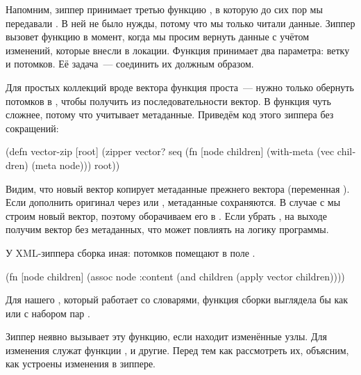 
Напомним, зиппер принимает третью функцию , в которую до сих пор мы
передавали . В ней не было нужды, потому что мы только читали
данные. Зиппер вызовет функцию в момент, когда мы просим вернуть данные с учётом
изменений, которые внесли в локации. Функция принимает два параметра: ветку и
потомков. Её задача~--- соединить их должным образом.

Для простых коллекций вроде вектора функция проста~--- нужно только обернуть
потомков в , чтобы получить из последовательности вектор. В 
функция чуть сложнее, потому что учитывает метаданные. Приведём код этого
зиппера без сокращений:


\begin{english}
  \begin{clojure/lines}
(defn vector-zip
  [root]
  (zipper vector?
          seq
          (fn [node children]
            (with-meta (vec children) (meta node)))
          root))
  \end{clojure/lines}
\end{english}

Видим, что новый вектор  копирует метаданные прежнего вектора
(переменная ). Если дополнить оригинал через  или
, метаданные сохраняются. В случае с  мы строим
новый вектор, поэтому оборачиваем его в . Если убрать
, на выходе получим вектор без метаданных, что может повлиять на
логику программы.

У XML-зиппера сборка иная: потомков помещают в поле .

\begin{english}
  \begin{clojure}
(fn [node children]
  (assoc node :content
              (and children (apply vector children))))
  \end{clojure}
\end{english}

Для нашего , который работает со словарями, функция сборки выглядела бы
как  или  с набором пар .


Зиппер неявно вызывает эту функцию, если находит изменённые узлы. Для изменения
служат функции ,  и другие. Перед тем как рассмотреть
их, объясним, как устроены изменения в зиппере.

